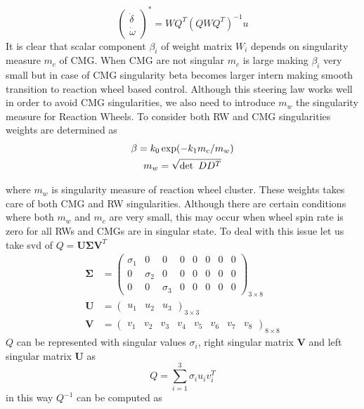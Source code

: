 \begin{equation}
\begin{pmatrix}
\dot{\delta }\\
\dot{\omega }
\end{pmatrix}^{*} =WQ^{T}\left( QWQ^{T}\right)^{-1} u
\label{eqn:vscmg_steering_1}
\end{equation}
It is clear that scalar component $\displaystyle \beta _{i}$ of weight matrix $\displaystyle W_{i}$ depends on singularity measure $\displaystyle m_{c}$ of CMG. When CMG are not singular $\displaystyle m_{c}$ is large making $\displaystyle \beta _{i}$ very small but in case of CMG singularity beta becomes larger intern making smooth transition to reaction wheel based control. Although this steering law works well in order to avoid CMG singularities, we also need to introduce $\displaystyle m_{w}$ the singularity measure for Reaction Wheels. To consider both RW and CMG singularities weights are determined as
\begin{gather}
\beta =k_{0}\exp( -k_{1} m_{c} /m_{w})\\
m_{w} =\sqrt{\det \ DD^{T}} \notag
\end{gather}

where $\displaystyle m_{w}$ is singularity measure of reaction wheel cluster. These weights takes care of both CMG and RW singularities. Although there are certain conditions where both $\displaystyle m_{w}$ and $\displaystyle m_{c}$ are very small, this may occur when wheel spin rate is zero for all RWs and CMGs are in singular state. To deal with this issue let us take \acrlong{svd} of $\displaystyle Q=\mathbf{U\Sigma V}^{T}$
\begin{equation*}
\begin{aligned}
\mathbf{\Sigma } & =\begin{pmatrix}
\sigma _{1} & 0 & 0 & 0 & 0 & 0 & 0 & 0\\
0 & \sigma _{2} & 0 & 0 & 0 & 0 & 0 & 0\\
0 & 0 & \sigma _{3} & 0 & 0 & 0 & 0 & 0
\end{pmatrix}_{3\times 8}\\
\mathbf{U} & =\begin{pmatrix}
u_{1} & u_{2} & u_{3}
\end{pmatrix}_{3\times 3}\\
\mathbf{V} & =\begin{pmatrix}
v_{1} & v_{2} & v_{3} & v_{4} & v_{5} & v_{6} & v_{7} & v_{8}
\end{pmatrix}_{8\times 8}
\end{aligned}
\end{equation*}
$\displaystyle Q$ can be represented with singular values $\displaystyle \sigma _{i}$, right singular matrix $\displaystyle \mathbf{V}$ and left singular matrix $\displaystyle \mathbf{U}$ as
\begin{equation}
Q=\sum ^{3}_{i=1} \sigma _{i} u_{i} v^{T}_{i}
\end{equation}
in this way $\displaystyle Q^{-1}$ can be computed as

